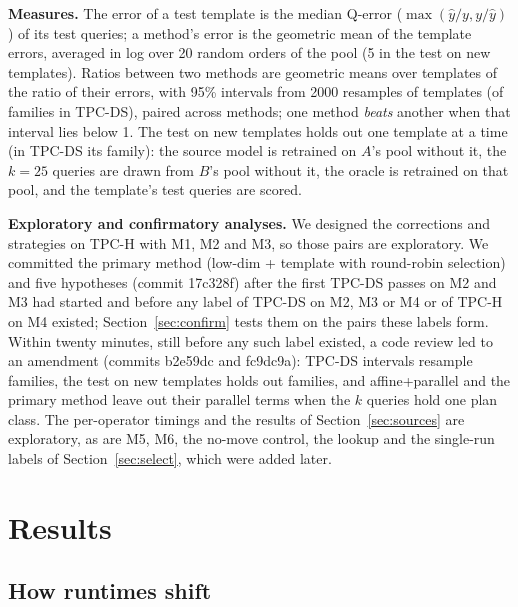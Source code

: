 \documentclass[sigconf,review]{acmart}
\begin{document}
\textbf{Measures.} The error of a test template is the median Q-error
($\max(\hat y/y, y/\hat y)$) of its test queries; a method's error is the
geometric mean of the template errors, averaged in log over 20 random
orders of the pool (5 in the test on new templates). Ratios between two
methods are geometric means over templates of the ratio of their errors,
with 95\% intervals from 2000 resamples of templates (of families in
TPC-DS), paired across methods; one method \emph{beats} another when that
interval lies below 1. The test on new templates holds out one template at
a time (in TPC-DS its family): the source model is retrained on $A$'s pool
without it, the $k=25$ queries are drawn from $B$'s pool without it, the
oracle is retrained on that pool, and the template's test queries are
scored.

\textbf{Exploratory and confirmatory analyses.} We designed the
corrections and strategies on TPC-H with M1, M2 and M3, so those pairs are
exploratory. We committed the primary method (low-dim + template with
round-robin selection) and five hypotheses (commit 17c328f) after the
first TPC-DS passes on M2 and M3 had started and before any label of TPC-DS
on M2, M3 or M4 or of TPC-H on M4 existed; Section~\ref{sec:confirm} tests
them on the \PHPairs{} pairs these labels form. Within twenty minutes, still
before any such label existed, a code review led to an amendment (commits
b2e59dc and fc9dc9a): TPC-DS intervals resample families, the test on new
templates holds out families, and affine+parallel and the primary method
leave out their parallel terms when the $k$ queries hold one plan class.
The per-operator timings and the results of Section~\ref{sec:sources} are
exploratory, as are M5, M6, the no-move control, the lookup and the
single-run labels of Section~\ref{sec:select}, which were added later.

\section{Results}
\label{sec:results}

\subsection{How runtimes shift}
\label{sec:shift}
\end{document}
